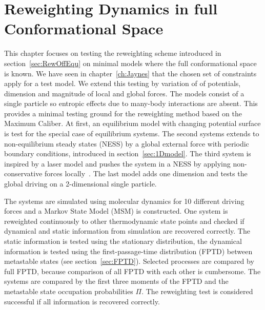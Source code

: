 % 
% 
% 
% 
% 
% 
% 

\chapter{Reweighting Dynamics in full Conformational Space }
\label{ch:RewU}

 
This chapter focuses on testing the reweighting scheme introduced in section~\ref{sec:RewOffEqu} on minimal models where the full conformational space is known. We have seen in chapter~\ref{ch:Jaynes} that the chosen set of constraints apply for a test model. We extend this testing by variation of of  potentials, dimension and magnitude of local and global forces. The models consist of a single particle so entropic effects due to many-body interactions are absent. This provides a minimal testing ground for the reweighting method based on the Maximum Caliber. At first, an equilibrium model with changing potential surface is test for the special case of equilibrium systems. The second systems extends to non-equilibrium steady states (NESS) by a global external force with periodic boundary conditions, introduced in section~\ref{sec:1Dmodel}. The third system is inspired by a laser model and pushes the system in a NESS by applying non-conservative forces locally~\cite{khan1983mechanism}. The last model adds one dimension and tests the global driving on a 2-dimensional single particle. 

The systems are simulated using molecular dynamics for 10 different driving forces and a Markov State Model (MSM) is constructed. One system is reweighted continuously to other thermodynamic state points and checked if dynamical and static information from simulation are recovered correctly. The static information is tested using the stationary distribution, the dynamical information is tested using the first-passage-time distribution (FPTD) between metastable states (see section~\ref{sec:FPTD}). Selected processes are compared by full FPTD, because comparison of all FPTD with each other is cumbersome. The systems are compared by the first three moments of the FPTD and the metastable state occupation probabilities $\Pi$. The reweighting test is considered successful if all information is recovered correctly.

